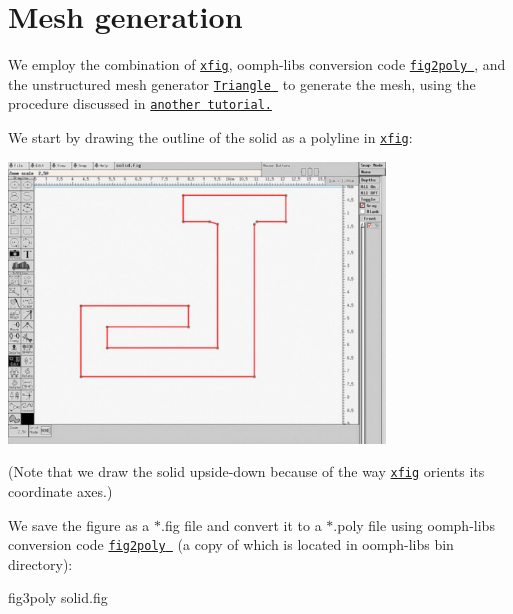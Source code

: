  

\hypertarget{index_mesh}{}\section{Mesh generation}\label{index_mesh}
We employ the combination of \href{http://en.wikipedia.org/wiki/Xfig}{\tt xfig}, {\ttfamily oomph-\/lib\textquotesingle{}s} conversion code \href{../../../meshes/mesh_from_xfig/html/index.html}{\tt {\ttfamily fig2poly} }, and the unstructured mesh generator \href{http://www.cs.cmu.edu/~quake/triangle.html}{\tt {\ttfamily Triangle} } to generate the mesh, using the procedure discussed in \href{../../../meshes/mesh_from_xfig/html/index.html}{\tt another tutorial.}

We start by drawing the outline of the solid as a polyline in \href{http://en.wikipedia.org/wiki/Xfig}{\tt xfig}\+:

 
\begin{DoxyImage}
\includegraphics[width=0.75\textwidth]{xfig_screenshot}
\end{DoxyImage}


(Note that we draw the solid upside-\/down because of the way \href{http://en.wikipedia.org/wiki/Xfig}{\tt xfig} orients its coordinate axes.)

We save the figure as a $\ast$.fig file and convert it to a $\ast$.poly file using {\ttfamily oomph-\/lib\textquotesingle{}s} conversion code \href{../../../meshes/mesh_from_xfig/html/index.html}{\tt {\ttfamily fig2poly} } (a copy of which is located in {\ttfamily oomph-\/lib\textquotesingle{}s} {\ttfamily bin} directory)\+:


\begin{DoxyCode}
fig3poly solid.fig 
\end{DoxyCode}


